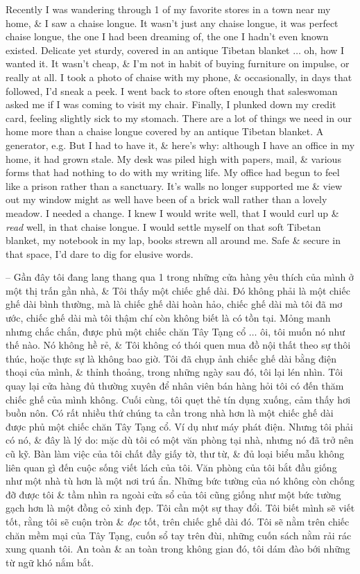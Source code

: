 \documentclass{article}
\begin{document}
\begin{itemize}
	Recently I was wandering through 1 of my favorite stores in a town near my home, \& I saw a chaise longue. It wasn't just any chaise longue, it was perfect chaise longue, the one I had been dreaming of, the one I hadn't even known existed. Delicate yet sturdy, covered in an antique Tibetan blanket $\ldots$ oh, how I wanted it. It wasn't cheap, \& I'm not in habit of buying furniture on impulse, or really at all. I took a photo of chaise with my phone, \& occasionally, in days that followed, I'd sneak a peek. I went back to store often enough that saleswoman asked me if I was coming to visit my chair. Finally, I plunked down my credit card, feeling slightly sick to my stomach. There are a lot of things we need in our home more than a chaise longue covered by an antique Tibetan blanket. A generator, e.g. But I had to have it, \& here's why: although I have an office in my home, it had grown stale. My desk was piled high with papers, mail, \& various forms that had nothing to do with my writing life. My office had begun to feel like a prison rather than a sanctuary. It's walls no longer supported me \& view out my window might as well have been of a brick wall rather than a lovely meadow. I needed a change. I knew I would write well, that I would curl up \& {\it read} well, in that chaise longue. I would settle myself on that soft Tibetan blanket, my notebook in my lap, books strewn all around me. Safe \& secure in that space, I'd dare to dig for elusive words.

	-- 	Gần đây tôi đang lang thang qua 1 trong những cửa hàng yêu thích của mình ở một thị trấn gần nhà, \& Tôi thấy một chiếc ghế dài. Đó không phải là một chiếc ghế dài bình thường, mà là chiếc ghế dài hoàn hảo, chiếc ghế dài mà tôi đã mơ ước, chiếc ghế dài mà tôi thậm chí còn không biết là có tồn tại. Mỏng manh nhưng chắc chắn, được phủ một chiếc chăn Tây Tạng cổ $\ldots$ ôi, tôi muốn nó như thế nào. Nó không hề rẻ, \& Tôi không có thói quen mua đồ nội thất theo sự thôi thúc, hoặc thực sự là không bao giờ. Tôi đã chụp ảnh chiếc ghế dài bằng điện thoại của mình, \& thỉnh thoảng, trong những ngày sau đó, tôi lại lén nhìn. Tôi quay lại cửa hàng đủ thường xuyên để nhân viên bán hàng hỏi tôi có đến thăm chiếc ghế của mình không. Cuối cùng, tôi quẹt thẻ tín dụng xuống, cảm thấy hơi buồn nôn. Có rất nhiều thứ chúng ta cần trong nhà hơn là một chiếc ghế dài được phủ một chiếc chăn Tây Tạng cổ. Ví dụ như máy phát điện. Nhưng tôi phải có nó, \& đây là lý do: mặc dù tôi có một văn phòng tại nhà, nhưng nó đã trở nên cũ kỹ. Bàn làm việc của tôi chất đầy giấy tờ, thư từ, \& đủ loại biểu mẫu không liên quan gì đến cuộc sống viết lách của tôi. Văn phòng của tôi bắt đầu giống như một nhà tù hơn là một nơi trú ẩn. Những bức tường của nó không còn chống đỡ được tôi \& tầm nhìn ra ngoài cửa sổ của tôi cũng giống như một bức tường gạch hơn là một đồng cỏ xinh đẹp. Tôi cần một sự thay đổi. Tôi biết mình sẽ viết tốt, rằng tôi sẽ cuộn tròn \& {\it đọc} tốt, trên chiếc ghế dài đó. Tôi sẽ nằm trên chiếc chăn mềm mại của Tây Tạng, cuốn sổ tay trên đùi, những cuốn sách nằm rải rác xung quanh tôi. An toàn \& an toàn trong không gian đó, tôi dám đào bới những từ ngữ khó nắm bắt.
	

\end{itemize}
\end{document}
